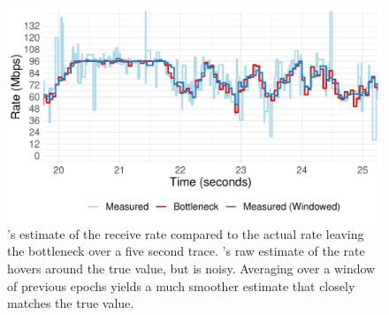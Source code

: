 \begin{figure}
    \centering
\begin{knitrout}
\color{fgcolor}
\includegraphics[width=\maxwidth]{figure/micro:time-1} 

\end{knitrout}
    \caption{\name's estimate of the receive rate compared to the actual rate leaving the bottleneck over a five second trace. 
    \name's raw estimate of the rate hovers around the true value, but is noisy. Averaging over a window of previous epochs
    yields a much smoother estimate that closely matches the true value.}
    \label{fig:micro:time}
\end{figure}
